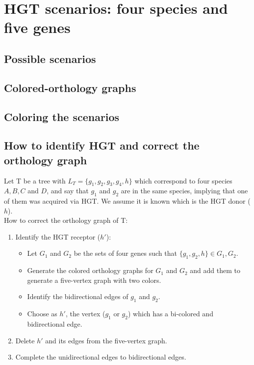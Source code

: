 \documentclass[10pt,a4paper,notitlepage]{article}
\begin{document}
\section{HGT scenarios: four species and five genes}	

\subsection{Possible scenarios}


\subsection{Colored-orthology graphs}

\subsection{Coloring the scenarios}

\subsection{How to identify HGT and correct the orthology graph}
	Let T be a tree with $L_T=\{ g_1, g_2, g_3, g_4, h\}$ which correspond to four species $A, B, C$ and $D$, and say that $g_1$ and $g_2$ are in the same species, implying that one of them was acquired via HGT. We assume it is known which is the HGT donor ($h$). 
	\\
	How to correct the orthology graph of T:
	\begin{enumerate}
		\item Identify the HGT receptor ($h'$):
			\begin{itemize}
				\item Let $G_1$ and $G_2$ be the sets of four genes such that $\{g_1, g_2, h\} \in G_1,G_2$.
				\item Generate the colored orthology graphs for $G_1$ and $G_2$ and add them to generate a five-vertex graph with two colors.
				\item Identify the bidirectional edges of $g_1$ and $g_2$.
				\item Choose as $h'$, the vertex ($g_1$ or  $g_2$) which has a bi-colored and bidirectional edge.
			\end{itemize}
		\item Delete $h'$ and its edges from the five-vertex graph.
		\item Complete the unidirectional edges to bidirectional edges. 
	\end{enumerate}
	
\end{document}
